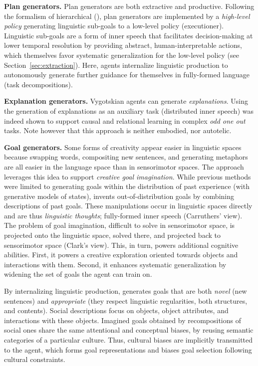 \textbf{Plan generators.} Plan generators are both extractive and productive. Following the formalism of hierarchical \rl (\hrl), plan generators are implemented by a \textit{high-level policy} generating linguistic sub-goals to a low-level policy (executioner).\cite{dayan_feudal_1993, sutton_between_1999} Linguistic sub-goals are a form of inner speech that facilitates decision-making at lower temporal resolution by providing abstract, human-interpretable actions, which themselves favor systematic generalization for the low-level policy (see Section~\ref{sec:extraction}).\cite{jiang_language_2019, chen_ask_2021, shridhar_alfworld_2021} Here, agents internalize linguistic production to autonomously generate further guidance for themselves in fully-formed language (task decompositions). 

\textbf{Explanation generators.} Vygotskian agents can generate \textit{explanations}. Using the generation of explanations as an auxiliary task (distributed inner speech) was indeed shown to support causal and relational learning in complex \textit{odd one out} tasks.\cite{lampinen_tell_2021} Note however that this approach is neither embodied, nor autotelic.

\textbf{Goal generators.} Some forms of creativity appear easier in linguistic spaces because swapping words, compositing new sentences, and generating metaphors are all easier in the language space than in sensorimotor spaces. The \imagine approach leverages this idea to support \textit{creative goal imagination}.\cite{colas_language_2020} While previous methods were limited to generating goals within the distribution of past experience (\eg with generative models of states\cite{nair2018visual}), \imagine invents out-of-distribution goals by combining descriptions of past goals. These manipulations occur in linguistic spaces directly and are thus \textit{linguistic thoughts}; fully-formed inner speech (Carruthers' view). The problem of goal imagination, difficult to solve in sensorimotor space, is projected onto the linguistic space, solved there, and projected back to sensorimotor space (Clark's view). This, in turn, powers additional cognitive abilities. First, it powers a creative exploration oriented towards objects and interactions with them. Second, it enhances systematic generalization by widening the set of goals the agent can train on.\cite{colas_language_2020}

By internalizing linguistic production, \imagine generates goals that are both \textit{novel} (new sentences) and \textit{appropriate} (they respect linguistic regularities, both structures, and contents).\cite{runco_standard_2012} Social descriptions focus on objects, object attributes, and interactions with these objects. Imagined goals obtained by recompositions of social ones share the same attentional and conceptual biases, \eg by reusing semantic categories of a particular culture. Thus, cultural biases are implicitly transmitted to the agent, which forms goal representations and biases goal selection following cultural constraints.\cite{colas_language_2020}

